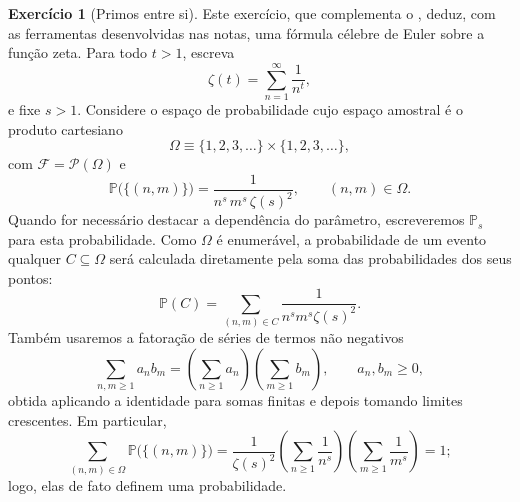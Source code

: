 \documentclass[12pt,portuguese]{article}
\theoremstyle{definition}
\newtheorem{exercise}{Exercício}
\begin{document}
\begin{exercise}[Primos entre si]\label{exercise:zeta-primos-entre-si}
Este exercício, que complementa o ,
deduz, com as ferramentas desenvolvidas nas notas, uma fórmula célebre de
Euler sobre a função zeta. Para todo \(t>1\), escreva
\[
\zeta(t)=\sum_{n=1}^{\infty}\frac{1}{n^t},
\]
e fixe \(s>1\).
Considere o espaço de probabilidade cujo espaço amostral é o produto
cartesiano
\[
\Omega\equiv\{1,2,3,\ldots\}\times\{1,2,3,\ldots\},
\]
com \(\mathcal{F}=\mathscr{P}(\Omega)\) e
\[
\mathbb{P}\bigl(\{(n, m)\}\bigr)
= \frac{1}{n^{s}\,m^{s}\,\zeta(s)^{2}}, \qquad (n, m) \in \Omega.
\]
Quando for necessário destacar a dependência do parâmetro, escreveremos
\(\mathbb{P}_s\) para esta probabilidade.
Como \(\Omega\) é enumerável, a probabilidade de um evento qualquer
\(C\subseteq\Omega\) será calculada diretamente pela soma das probabilidades dos
seus pontos:
\[
\mathbb{P}(C)=\sum_{(n,m)\in C}
\frac{1}{n^{s}m^{s}\zeta(s)^2}.
\]
Também usaremos a fatoração de séries de termos não negativos
\[
\sum_{n,m\geqslant1}a_n b_m
=\left(\sum_{n\geqslant1}a_n\right)
 \left(\sum_{m\geqslant1}b_m\right),
\qquad a_n,b_m\geqslant0,
\]
obtida aplicando a identidade para somas finitas e depois tomando limites
crescentes. Em particular,
\[
\sum_{(n,m)\in\Omega}\mathbb{P}\bigl(\{(n,m)\}\bigr)
=\frac{1}{\zeta(s)^2}
  \left(\sum_{n\geqslant1}\frac{1}{n^s}\right)
  \left(\sum_{m\geqslant1}\frac{1}{m^s}\right)=1;
\]
logo, elas de fato definem uma probabilidade.


\end{exercise}
\end{document}
